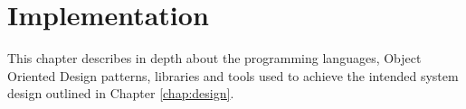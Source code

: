 \newpage
\chapter{Implementation}
This chapter describes in depth about the programming languages, Object Oriented Design patterns, libraries and tools used to achieve the intended system design 
outlined in Chapter \ref{chap:design}.

%



